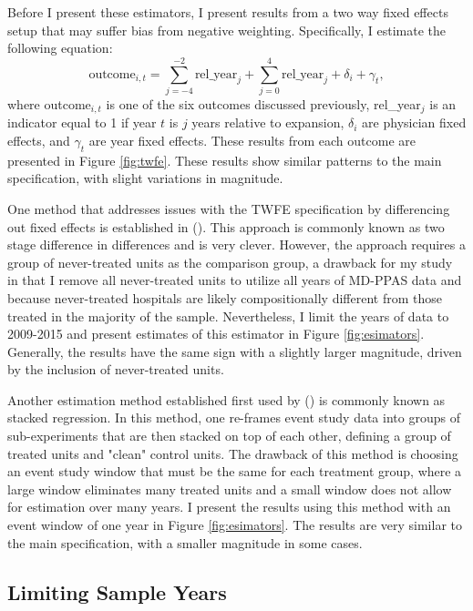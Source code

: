 \documentclass[11pt]{article}
\begin{document}
Before I present these estimators, I present results from a two way fixed effects setup that may suffer bias from negative weighting. Specifically, I estimate the following equation:
$$\text{outcome}_{i,t}=\sum_{j=-4}^{-2} \text{rel\_year}_{j} + \sum_{j=0}^{4} \text{rel\_year}_{j} + \delta_i + \gamma_t,$$
where outcome$_{i,t}$ is one of the six outcomes discussed previously, rel\_year$_j$ is an indicator equal to 1 if year $t$ is $j$ years relative to expansion, $\delta_i$ are physician fixed effects, and $\gamma_t$ are year fixed effects.
These results from each outcome are presented in Figure \ref{fig:twfe}. These results show similar patterns to the main specification, with slight variations in magnitude. 

One method that addresses issues with the TWFE specification by differencing out fixed effects is established in \citeauthor{gardner2021two} (\citeyear{gardner2021two}). This approach is commonly known as two stage difference in differences and is very clever. However, the approach requires a group of never-treated units as the comparison group, a drawback for my study in that I remove all never-treated units to utilize all years of MD-PPAS data and because never-treated hospitals are likely compositionally different from those treated in the majority of the sample. Nevertheless, I limit the years of data to 2009-2015 and present estimates of this estimator in Figure \ref{fig:esimators}. Generally, the results have the same sign with a slightly larger magnitude, driven by the inclusion of never-treated units. 

Another estimation method established first used by \citeauthor{cengiz2019effect} (\citeyear{cengiz2019effect}) is commonly known as stacked regression. In this method, one re-frames event study data into groups of sub-experiments that are then stacked on top of each other, defining a group of treated units and "clean" control units. The drawback of this method is choosing an event study window that must be the same for each treatment group, where a large window eliminates many treated units and a small window does not allow for estimation over many years. I present the results using this method with an event window of one year in Figure \ref{fig:esimators}. The results are very similar to the main specification, with a smaller magnitude in some cases. 

\subsection{Limiting Sample Years}\label{app:years}
\end{document}
